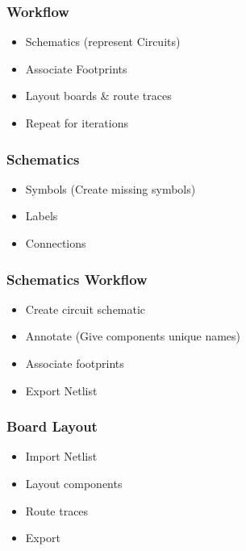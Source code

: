 \documentclass{beamer}
\begin{document}
\begin{frame}
  \frametitle{Workflow}
  \begin{itemize}
    \item Schematics (represent Circuits)
    \item Associate Footprints
    \item Layout boards \& route traces
    \item Repeat for iterations
  \end{itemize}
\end{frame}


\begin{frame}
  \frametitle{Schematics}
  \begin{itemize}
    \item Symbols (Create missing symbols)
    \item Labels
    \item Connections
  \end{itemize}
\end{frame}


\begin{frame}
  \frametitle{Schematics Workflow}
  \begin{itemize}
    \item Create circuit schematic
    \item Annotate (Give components unique names)
    \item Associate footprints
    \item Export Netlist
  \end{itemize}
\end{frame}


\begin{frame}
  \frametitle{Board Layout}
  \begin{itemize}
    \item Import Netlist
    \item Layout components
    \item Route traces
    \item Export
  \end{itemize}
\end{frame}
\end{document}
